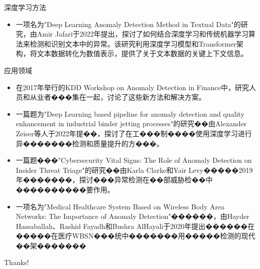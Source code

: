 \documentclass[UTF8,AutoFakeBold,AutoFakeSlant]{beamer}
\begin{document}
\begin{frame}{深度学习方法}
    \begin{itemize}
        \item 一项名为"Deep Learning Anomaly Detection Method in Textual Data"的研究，由Amir Jafari于2022年提出，探讨了如何结合深度学习和传统机器学习算法来检测和识别文本中的异常。该研究利用深度学习模型和Transformer架构，将文本数据转化为数值表示，提供了关于文本数据的关键上下文信息。
    \end{itemize}
\end{frame}

\begin{frame}{应用领域}
    \scriptsize
    \begin{itemize}
        \item 在2017年举行的KDD Workshop on Anomaly Detection in Finance中，研究人员和从业者���集在一起，讨论了这些新方法和解决方案。
        \item 一篇题为"Deep Learning based pipeline for anomaly detection and quality enhancement in industrial binder jetting processes"的研究��由Alexander Zeiser等人于2022年提��，探讨了在工���制����使用深度学习进行异�������检测和质量提升的方���。
        \item 一篇题���"Cybersecurity Vital Signs: The Role of Anomaly Detection on Insider Threat Triage"的研究��由Karla Clarke和Yair Levy�����2019年�������，探讨���异常检测在��部威胁检��中����������要作用。
        \item 一项名为"Medical Healthcare System Based on Wireless Body Area Networks: The Importance of Anomaly Detection"������，由Hayder Hassaballah、Rashid Fayadh和Bushra AlHayali于2020年提出������在�����在医疗WBSN���统中�������用�����检测的现代��架�������
    \end{itemize}
\end{frame}

\begin{frame}
    \begin{center}
        {\Huge\calligra Thanks!}
    \end{center}
\end{frame}
\end{document}
